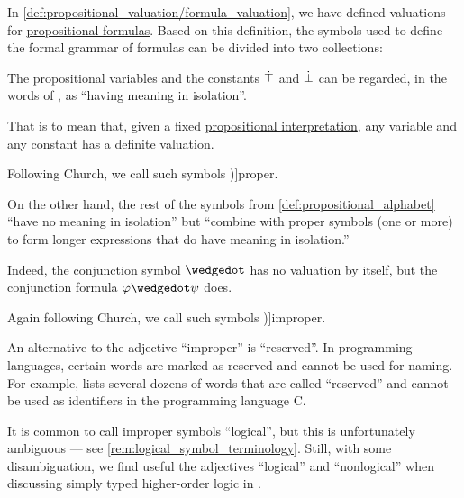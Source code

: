 \begin{concept}\label{con:improper_symbol}
  In \cref{def:propositional_valuation/formula_valuation}, we have defined valuations for \hyperref[def:propositional_syntax/formula]{propositional formulas}. Based on this definition, the symbols used to define the formal grammar of formulas can be divided into two collections:
  \begin{thmenum}
     The propositional variables and the constants \( \dot{\top} \) and \( \dot{\bot} \) can be regarded, in the words of , as \enquote{having meaning in isolation}.

    That is to mean that, given a fixed \hyperref[def:propositional_valuation/interpretation]{propositional interpretation}, any variable and any constant has a definite valuation.

    Following Church, we call such symbols \term[en=proper (symbol) (\cite[32]{Church1956LogicVol1})]{proper}.

     On the other hand, the rest of the symbols from \cref{def:propositional_alphabet} \enquote{have no meaning in isolation} but \enquote{combine with proper symbols (one or more) to form longer expressions that do have meaning in isolation.}

    Indeed, the conjunction symbol \( {\synwedge} \) has no valuation by itself, but the conjunction formula \( \varphi \synwedge \psi \) does.

    Again following Church, we call such symbols \term[en=improper (symbol) (\cite[32]{Church1956LogicVol1})]{improper}.
  \end{thmenum}
\end{concept}
\begin{comments}
  \item An alternative to the adjective \enquote{improper} is \enquote{reserved}. In programming languages, certain words are marked as reserved and cannot be used for naming. For example, \cite[\S 6.4.1]{ISO:9899:2018} lists several dozens of words that are called \enquote{reserved} and cannot be used as identifiers in the programming language C.

  \item It is common to call improper symbols \enquote{logical}, but this is unfortunately ambiguous --- see \cref{rem:logical_symbol_terminology}. Still, with some disambiguation, we find useful the adjectives \enquote{logical} and \enquote{nonlogical} when discussing simply typed higher-order logic in .
\end{comments}

